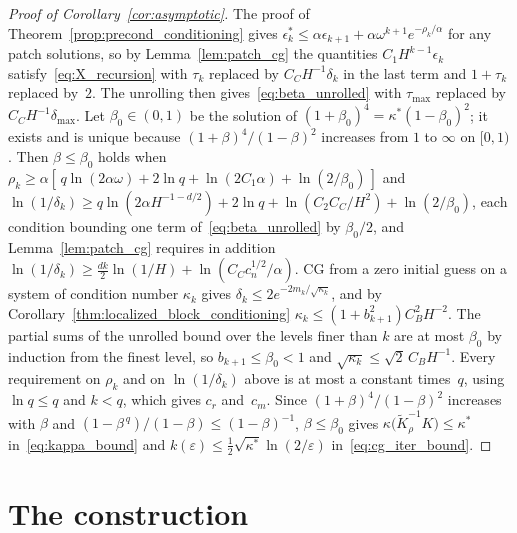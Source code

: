 \documentclass[hidelinks]{siamart}
\theoremstyle{nonumberplain}
\numberwithin{theorem}{section}
\begin{document}
\begin{proof}[Proof of Corollary~\textup{\ref{cor:asymptotic}}]
The proof of Theorem~\ref{prop:precond_conditioning} gives
$\epsilon^\ast_k \leq \alpha\epsilon_{k+1} + \alpha\omega^{k+1}e^{-\rho_k/\alpha}$
for any patch solutions, so by Lemma~\ref{lem:patch_cg} the quantities
$C_1 H^{k-1}\epsilon_k$ satisfy~\eqref{eq:X_recursion} with $\tau_k$
replaced by $C_C H^{-1}\delta_k$ in the last term and $1+\tau_k$ replaced
by~$2$.  The unrolling then gives~\eqref{eq:beta_unrolled} with
$\tau_{\max}$ replaced by $C_C H^{-1}\delta_{\max}$.  Let
$\beta_0 \in (0,1)$ be the solution of
$(1+\beta_0)^4 = \kappa^\ast (1-\beta_0)^2$; it exists and is unique
because $(1+\beta)^4/(1-\beta)^2$ increases from $1$ to $\infty$ on
$[0,1)$.  Then $\beta \leq \beta_0$ holds when
$\rho_k \geq \alpha[\,q\ln(2\alpha\omega) + 2\ln q + \ln(2C_1\alpha) + \ln(2/\beta_0)\,]$
and
$\ln(1/\delta_k) \geq q\ln(2\alpha H^{-1-d/2}) + 2\ln q + \ln(C_2 C_C/H^2) + \ln(2/\beta_0)$,
each condition bounding one term of~\eqref{eq:beta_unrolled} by
$\beta_0/2$, and Lemma~\ref{lem:patch_cg} requires in addition
$\ln(1/\delta_k) \geq \tfrac{dk}{2}\ln(1/H) + \ln(C_C c_n^{1/2}/\alpha)$.
CG from a zero initial guess on a system of condition number $\kappa_k$
gives $\delta_k \leq 2e^{-2m_k/\sqrt{\kappa_k}}$, and by
Corollary~\ref{thm:localized_block_conditioning}
$\kappa_k \leq (1+b_{k+1}^2) C_B^2 H^{-2}$.  The partial sums of the
unrolled bound over the levels finer than $k$ are at most $\beta_0$ by
induction from the finest level, so $b_{k+1} \leq \beta_0 < 1$ and
$\sqrt{\kappa_k} \leq \sqrt{2}\, C_B H^{-1}$.  Every requirement on
$\rho_k$ and on $\ln(1/\delta_k)$ above is at most a constant times~$q$,
using $\ln q \leq q$ and $k < q$, which gives $c_r$ and~$c_m$.  Since
$(1+\beta)^4/(1-\beta)^2$ increases with $\beta$ and
$(1-\beta^{\,q})/(1-\beta) \leq (1-\beta)^{-1}$, $\beta \leq \beta_0$
gives $\kappa\bigl(\widetilde{K}_\rho^{-1}K\bigr) \leq \kappa^\ast$
in~\eqref{eq:kappa_bound} and
$k(\varepsilon) \leq \tfrac12 \sqrt{\kappa^\ast} \ln(2/\varepsilon)$
in~\eqref{eq:cg_iter_bound}.
\end{proof}

\section{The construction}
\label{sec:implementation}
\end{document}

